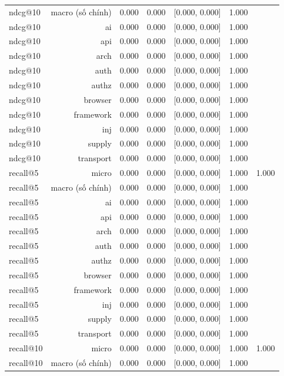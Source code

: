 \begin{table}[ht]
\begin{tabular}{lrrrrrr}
ndcg@10 & macro (số chính) & 0.000 & 0.000 & [0.000, 0.000] & 1.000 &  \\
ndcg@10 & ai & 0.000 & 0.000 & [0.000, 0.000] & 1.000 &  \\
ndcg@10 & api & 0.000 & 0.000 & [0.000, 0.000] & 1.000 &  \\
ndcg@10 & arch & 0.000 & 0.000 & [0.000, 0.000] & 1.000 &  \\
ndcg@10 & auth & 0.000 & 0.000 & [0.000, 0.000] & 1.000 &  \\
ndcg@10 & authz & 0.000 & 0.000 & [0.000, 0.000] & 1.000 &  \\
ndcg@10 & browser & 0.000 & 0.000 & [0.000, 0.000] & 1.000 &  \\
ndcg@10 & framework & 0.000 & 0.000 & [0.000, 0.000] & 1.000 &  \\
ndcg@10 & inj & 0.000 & 0.000 & [0.000, 0.000] & 1.000 &  \\
ndcg@10 & supply & 0.000 & 0.000 & [0.000, 0.000] & 1.000 &  \\
ndcg@10 & transport & 0.000 & 0.000 & [0.000, 0.000] & 1.000 &  \\
recall@5 & micro & 0.000 & 0.000 & [0.000, 0.000] & 1.000 & 1.000 \\
recall@5 & macro (số chính) & 0.000 & 0.000 & [0.000, 0.000] & 1.000 &  \\
recall@5 & ai & 0.000 & 0.000 & [0.000, 0.000] & 1.000 &  \\
recall@5 & api & 0.000 & 0.000 & [0.000, 0.000] & 1.000 &  \\
recall@5 & arch & 0.000 & 0.000 & [0.000, 0.000] & 1.000 &  \\
recall@5 & auth & 0.000 & 0.000 & [0.000, 0.000] & 1.000 &  \\
recall@5 & authz & 0.000 & 0.000 & [0.000, 0.000] & 1.000 &  \\
recall@5 & browser & 0.000 & 0.000 & [0.000, 0.000] & 1.000 &  \\
recall@5 & framework & 0.000 & 0.000 & [0.000, 0.000] & 1.000 &  \\
recall@5 & inj & 0.000 & 0.000 & [0.000, 0.000] & 1.000 &  \\
recall@5 & supply & 0.000 & 0.000 & [0.000, 0.000] & 1.000 &  \\
recall@5 & transport & 0.000 & 0.000 & [0.000, 0.000] & 1.000 &  \\
recall@10 & micro & 0.000 & 0.000 & [0.000, 0.000] & 1.000 & 1.000 \\
recall@10 & macro (số chính) & 0.000 & 0.000 & [0.000, 0.000] & 1.000 &  \\

\end{tabular}
\end{table}
